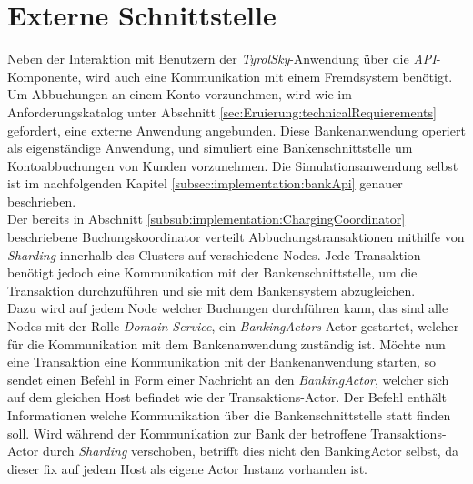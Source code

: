 \section{Externe Schnittstelle}
\label{sec:implementation:externalApi}
Neben der Interaktion mit Benutzern der \textit{TyrolSky}-Anwendung über die \textit{API}-Komponente, wird auch eine Kommunikation mit einem Fremdsystem benötigt. Um Abbuchungen an einem Konto vorzunehmen, wird wie im Anforderungskatalog unter Abschnitt \ref{sec:Eruierung:technicalRequierements} gefordert, eine externe Anwendung angebunden. Diese Bankenanwendung operiert als eigenständige Anwendung, und simuliert eine Bankenschnittstelle um Kontoabbuchungen von Kunden vorzunehmen. Die Simulationsanwendung selbst ist im nachfolgenden Kapitel \ref{subsec:implementation:bankApi} genauer beschrieben. \\
Der bereits in Abschnitt \ref{subsub:implementation:ChargingCoordinator}  beschriebene Buchungskoordinator verteilt Abbuchungstransaktionen mithilfe von \textit{Sharding} innerhalb des Clusters auf verschiedene Nodes. Jede Transaktion benötigt jedoch eine Kommunikation mit der Bankenschnittstelle, um die Transaktion durchzuführen und sie mit dem Bankensystem abzugleichen.  \\
Dazu wird auf jedem Node welcher Buchungen durchführen kann, das sind alle Nodes mit der Rolle \textit{Domain-Service}, ein \textit{BankingActors} Actor gestartet, welcher für die Kommunikation mit dem Bankenanwendung zuständig ist.
Möchte nun eine Transaktion eine Kommunikation mit der Bankenanwendung starten, so sendet einen Befehl in Form einer Nachricht an den \textit{BankingActor}, welcher sich auf dem gleichen Host befindet wie der Transaktions-Actor. Der Befehl enthält Informationen welche Kommunikation über die Bankenschnittstelle statt finden soll. Wird während der Kommunikation zur Bank der betroffene Transaktions-Actor durch \textit{Sharding} verschoben, betrifft dies nicht den BankingActor selbst, da dieser fix auf jedem Host als eigene Actor Instanz vorhanden ist. 

